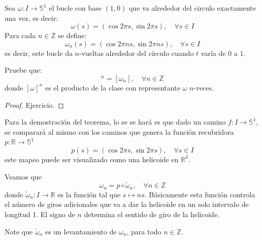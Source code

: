 \documentclass[12pt]{report}
\theoremstyle{largebreak}
\newcommand\cf[3]{\ensuremath{#1:#2\rightarrow#3}}
\begin{document}
    \begin{mydef}
        Sea $\cf{\omega}{I}{\mathbb{S}^1}$ el bucle con base $(1,0)$ que va alrededor del circulo exactamente una vez, es decir:
        \begin{equation*}
            \omega(s)=(\cos 2\pi s,\sin 2\pi s),\quad\forall s\in I
        \end{equation*}
        Para cada $n\in\mathbb{Z}$ se define:
        \begin{equation*}
            \omega_n(s)=(\cos 2\pi ns,\sin 2\pi ns),\quad\forall s\in I
        \end{equation*}
        es decir, este bucle da $n$-vueltas alrededor del círculo cuando $t$ varía de $0$ a $1$.
    \end{mydef}

    \begin{excer}
        Pruebe que:
        \begin{equation*}
            [\omega]^n=[\omega_n],\quad\forall n\in\mathbb{Z}
        \end{equation*}
        donde $[\omega]^n$ es el producto de la clase con representante $\omega$ $n$-veces.
    \end{excer}

    \begin{proof}
        Ejercicio.
    \end{proof}

    Para la demostración del teorema, lo se se hará es que dado un camino $\cf{f}{I}{\mathbb{S}^1}$, se comparará al mismo con los caminos que genera la función recubridora $\cf{p}{\mathbb{R}}{\mathbb{S}^1}$
    \begin{equation*}
        p(s)=(\cos 2\pi s,\sin 2\pi s),\quad\forall s\in I
    \end{equation*}
    este mapeo puede ser visualizado como una helicoide en $\mathbb{R}^3$.

    \begin{obs}
        Veamos que
        \begin{equation*}
            \omega_n=p\circ\widetilde{\omega}_n,\quad\forall n\in\mathbb{Z}
        \end{equation*}
        donde $\cf{\widetilde{\omega}_n}{I}{\mathbb{R}}$ es la función tal que $s\mapsto ns$. Básicamente esta función controla el número de giros adicionales que va a dar la helicoide en un solo intervalo de longitud 1. El signo de $n$ determina el sentido de giro de la helicoide.

        Note que $\widetilde{\omega}_n$ es un levantamiento de $\omega_n$, para todo $n\in\mathbb{Z}$.
    \end{obs}
    
\end{document}

